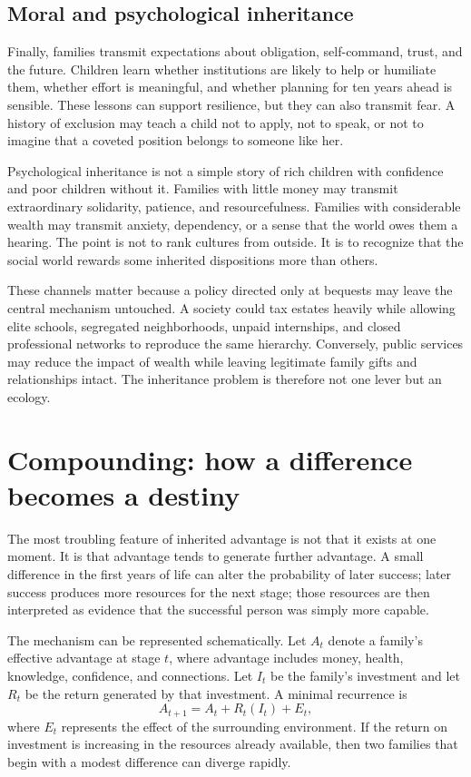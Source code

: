 ﻿\documentclass[12pt,a4paper]{book}
\begin{document}
\subsection{Moral and psychological inheritance}

Finally, families transmit expectations about obligation, self-command,
trust, and the future.  Children learn whether institutions are likely to
help or humiliate them, whether effort is meaningful, and whether planning
for ten years ahead is sensible.  These lessons can support resilience, but
they can also transmit fear.  A history of exclusion may teach a child not
to apply, not to speak, or not to imagine that a coveted position belongs to
someone like her.

Psychological inheritance is not a simple story of rich children with
confidence and poor children without it.  Families with little money may
transmit extraordinary solidarity, patience, and resourcefulness.  Families
with considerable wealth may transmit anxiety, dependency, or a sense that
the world owes them a hearing.  The point is not to rank cultures from
outside.  It is to recognize that the social world rewards some inherited
dispositions more than others.

These channels matter because a policy directed only at bequests may leave
the central mechanism untouched.  A society could tax estates heavily while
allowing elite schools, segregated neighborhoods, unpaid internships, and
closed professional networks to reproduce the same hierarchy.  Conversely,
public services may reduce the impact of wealth while leaving legitimate
family gifts and relationships intact.  The inheritance problem is therefore
not one lever but an ecology.

\section{Compounding: how a difference becomes a destiny}

The most troubling feature of inherited advantage is not that it exists at
one moment.  It is that advantage tends to generate further advantage.  A
small difference in the first years of life can alter the probability of
later success; later success produces more resources for the next stage;
those resources are then interpreted as evidence that the successful person
was simply more capable.

The mechanism can be represented schematically.  Let $A_t$ denote a
family's effective advantage at stage $t$, where advantage includes money,
health, knowledge, confidence, and connections.  Let $I_t$ be the family's
investment and let $R_t$ be the return generated by that investment.  A
minimal recurrence is
\begin{equation}
  A_{t+1} = A_t + R_t(I_t) + E_t,
  \label{eq:advantage-recurrence}
\end{equation}
where $E_t$ represents the effect of the surrounding environment.  If the
return on investment is increasing in the resources already available, then
two families that begin with a modest difference can diverge rapidly.
\end{document}
